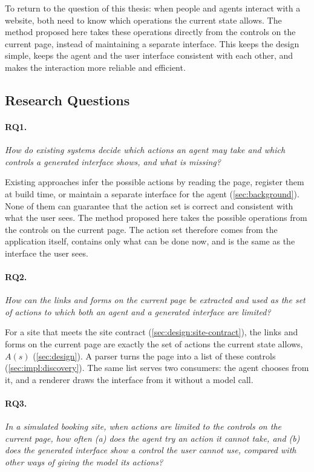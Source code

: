 To return to the question of this thesis: when people and agents interact with a website, both need to know which operations the current state allows.
The method proposed here takes these operations directly from the controls on the current page, instead of maintaining a separate interface.
This keeps the design simple, keeps the agent and the user interface consistent with each other, and makes the interaction more reliable and efficient.

\subsection{Research Questions}

\paragraph{RQ1.} \emph{How do existing systems decide which actions an agent may take and which controls a generated interface shows, and what is missing?}

Existing approaches infer the possible actions by reading the page, register them at build time, or maintain a separate interface for the agent (\autoref{sec:background}).
None of them can guarantee that the action set is correct and consistent with what the user sees.
The method proposed here takes the possible operations from the controls on the current page.
The action set therefore comes from the application itself, contains only what can be done now, and is the same as the interface the user sees.


\paragraph{RQ2.} \emph{How can the links and forms on the current page be extracted and used as the set of actions to which both an agent and a generated interface are limited?}

For a site that meets the site contract (\autoref{sec:design:site-contract}), the links and forms on the current page are exactly the set of actions the current state allows, $A(s)$ (\autoref{sec:design}).
A parser turns the page into a list of these controls (\autoref{sec:impl:discovery}).
The same list serves two consumers: the agent chooses from it, and a renderer draws the interface from it without a model call.

\paragraph{RQ3.} \emph{In a simulated booking site, when actions are limited to the controls on the current page, how often (a) does the agent try an action it cannot take, and (b) does the generated interface show a control the user cannot use, compared with other ways of giving the model its actions?}

